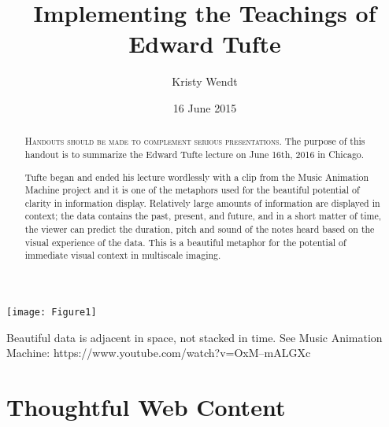 \documentclass{tufte-handout}
\title{Implementing the Teachings of Edward Tufte}
\author{Kristy Wendt}
\date{16 June 2015}  %
\begin{document}
\maketitle%


\begin{abstract}
\noindent \textsc{Handouts should be made to complement serious presentations.} 
The purpose of this handout is to summarize the Edward Tufte lecture on June 16th, 2016 in Chicago.  

Tufte began and ended his lecture wordlessly with a clip from the Music Animation Machine project and it is one of the metaphors used for the beautiful potential of  clarity in information display.  Relatively large amounts of information are displayed in context; the data contains the past, present, and future, and in a short matter of time, the viewer can predict the duration, pitch and sound of the notes heard based on the visual experience of the data.  This is a beautiful metaphor for the potential of immediate visual context in multiscale imaging.
\end{abstract}





\begin{marginfigure}
\texttt{[image: Figure1]}
\caption{Beautiful data is adjacent in space, not stacked in time. See Music Animation Machine: https://www.youtube.com/watch?v=OxM--mALGXc}
\end{marginfigure}








\section{Thoughtful Web Content}
\end{document}
